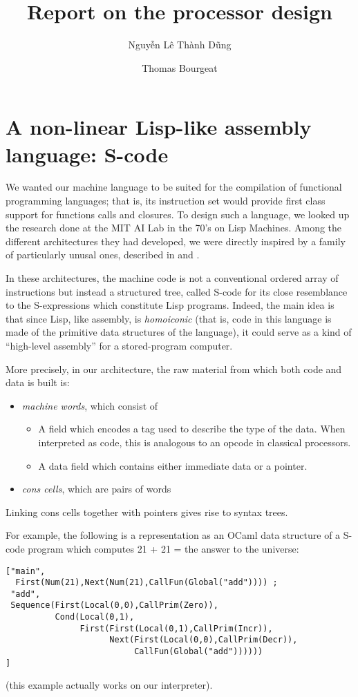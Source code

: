 \documentclass[a4paper, 11pt]{article}
\begin{document}
\title{Report on the processor design}
\author{Nguyễn Lê Thành Dũng \and Thomas Bourgeat}

\maketitle

\section{A non-linear Lisp-like assembly language: S-code}

We wanted our machine language to be suited for the compilation of functional programming languages; that is, its instruction set would provide first class support for functions calls and closures. To design such a language, we looked up the research done at the MIT AI Lab in the 70's on Lisp Machines. Among the different architectures they had developed, we were directly inspired by a family of particularly unusal ones, described in \cite{SIMPLE} and \cite{SCHEME-79}.

In these architectures, the machine code is not a conventional ordered array of instructions but instead a structured tree, called S-code for its close resemblance to the S-expressions which constitute Lisp programs. Indeed, the main idea is that since Lisp, like assembly, is \emph{homoiconic} (that is, code in this language is made of the primitive data structures of the language), it could serve as a kind of \enquote{high-level assembly} for a stored-program computer.

More precisely, in our architecture, the raw material from which both code and data is built is:
\begin{itemize}
\item \emph{machine words}, which consist of
  \begin{itemize}
  \item A field which encodes a tag used to describe the type of the data. When interpreted as code, this is analogous to an opcode in classical processors.
  \item A data field which contains either immediate data or a pointer.
  \end{itemize}
\item \emph{cons cells}, which are pairs of words
\end{itemize}
Linking cons cells together with pointers gives rise to syntax trees.

For example, the following is a representation as an OCaml data structure of a S-code program which computes 21 + 21 = the answer to the universe:
\lstset{basicstyle=\small\ttfamily,language=Caml}
\begin{lstlisting}
["main",
  First(Num(21),Next(Num(21),CallFun(Global("add")))) ;
 "add",
 Sequence(First(Local(0,0),CallPrim(Zero)),
          Cond(Local(0,1),
               First(First(Local(0,1),CallPrim(Incr)),
                     Next(First(Local(0,0),CallPrim(Decr)),
                          CallFun(Global("add"))))))
]
\end{lstlisting}
(this example actually works on our interpreter).
\end{document}
